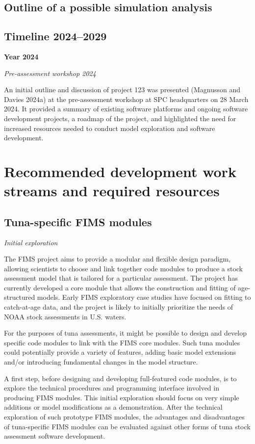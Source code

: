 \documentclass{SCreport}
\begin{document}
\subsection{Outline of a possible simulation analysis}

\subsection{Timeline 2024--2029}

\textbf{Year 2024}

\textit{Pre-assessment workshop 2024}

An initial outline and discussion of project 123 was presented (Magnusson and
Davies 2024a) at the pre-assessment workshop at SPC headquarters on 28 March
2024. It provided a summary of existing software platforms and ongoing software
development projects, a roadmap of the project, and highlighted the need for
increased resources needed to conduct model exploration and software
development.

\section{Recommended development work streams and required resources}

\subsection{Tuna-specific FIMS modules}
\label{sec:tuna-fims}

\textit{Initial exploration}

The FIMS project aims to provide a modular and flexible design paradigm,
allowing scientists to choose and link together code modules to produce a stock
assessment model that is tailored for a particular assessment. The project has
currently developed a core module that allows the construction and fitting of
age-structured models. Early FIMS exploratory case studies have focused on
fitting to catch-at-age data, and the project is likely to initially prioritize
the needs of NOAA stock assessments in U.S. waters.

For the purposes of tuna assessments, it might be possible to design and develop
specific code modules to link with the FIMS core modules. Such tuna modules
could potentially provide a variety of features, adding basic model extensions
and/or introducing fundamental changes in the model structure.

A first step, before designing and developing full-featured code modules, is to
explore the technical procedures and programming interface involved in producing
FIMS modules. This initial exploration should focus on very simple additions or
model modifications as a demonstration. After the technical exploration of such
prototype FIMS modules, the advantages and disadvantages of tuna-specific FIMS
modules can be evaluated against other forms of tuna stock assessment software
development.
\end{document}
